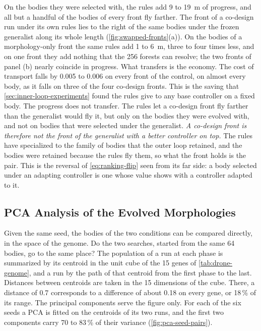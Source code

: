 On the bodies they were selected with, the rules add 9 to 19~m of progress, and all but a handful of the bodies of every front fly farther. The front of a co-design run under its own rules lies to the right of the same bodies under the frozen generalist along its whole length (\autoref{fig:swapped-fronts}(a)). On the bodies of a morphology-only front the same rules add 1 to 6~m, three to four times less, and on one front they add nothing that the 256 forests can resolve; the two fronts of panel (b) nearly coincide in progress. What transfers is the economy. The cost of transport falls by 0.005 to 0.006 on every front of the control, on almost every body, as it falls on three of the four co-design fronts. This is the saving that \autoref{sec:inner-loop-experiments} found the rules give to any base controller on a fixed body. The progress does not transfer. The rules let a co-design front fly farther than the generalist would fly it, but only on the bodies they were evolved with, and not on bodies that were selected under the generalist. \emph{A co-design front is therefore not the front of the generalist with a better controller on top.} The rules have specialized to the family of bodies that the outer loop retained, and the bodies were retained because the rules fly them, so what the front holds is the pair. This is the reversal of \eqref{eq:ranking-flip} seen from its far side: a body selected under an adapting controller is one whose value shows with a controller adapted to it.

\subsection{PCA Analysis of the Evolved Morphologies}
\label{subsec:results-pca}

Given the same seed, the bodies of the two conditions can be compared directly, in the space of the genome. Do the two searches, started from the same 64 bodies, go to the same place? The population of a run at each phase is summarized by its centroid in the unit cube of the 15 genes of \autoref{tab:drone-genome}, and a run by the path of that centroid from the first phase to the last. Distances between centroids are taken in the 15 dimensions of the cube. There, a distance of 0.7 corresponds to a difference of about 0.18 on every gene, or 18\,\% of its range. The principal components serve the figure only. For each of the six seeds a PCA is fitted on the centroids of its two runs, and the first two components carry 70 to 83\,\% of their variance (\autoref{fig:pca-seed-pairs}).

